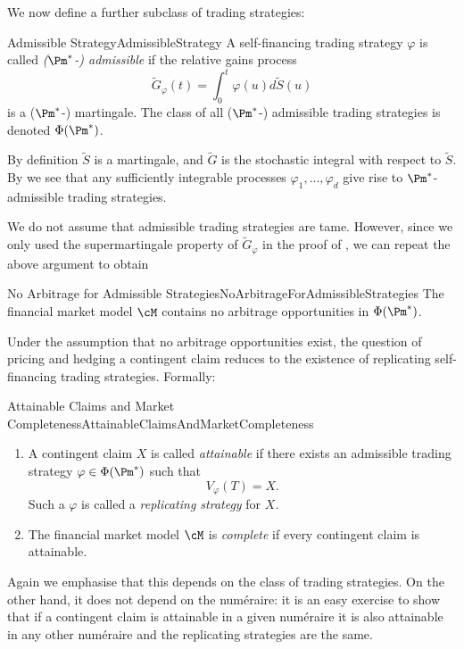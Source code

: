 We now define a further subclass of trading strategies:

\begin{defn}{Admissible Strategy}{AdmissibleStrategy}
	A self-financing trading strategy $\varphi$ is called \textit{($\Pm^*$-) admissible} if the relative gains process
	\[
		\tilde{G}_{\varphi}(t) = \int_0^t \varphi(u)d\tilde{S}(u)
	\]
	is a ($\Pm^*$-) martingale. The class of all ($\Pm^*$-) admissible trading strategies is denoted $\Phi(\Pm^*)$.
\end{defn}

By definition $\tilde{S}$ is a martingale, and $\tilde{G}$ is the stochastic integral with respect to $\tilde{S}$. By  we see that any sufficiently integrable processes $\varphi_1, \dots, \varphi_d$ give rise to $\Pm^*$-admissible trading strategies.

We do not assume that admissible trading strategies are tame. However, since we only used the supermartingale property of \(\tilde{G}_{\varphi}\) in the proof of , we can repeat the above argument to obtain

\begin{thm}{No Arbitrage for Admissible Strategies}{NoArbitrageForAdmissibleStrategies}
	The financial market model $\cM$ contains no arbitrage opportunities in $\Phi(\Pm^*)$.
\end{thm}

Under the assumption that no arbitrage opportunities exist, the question of pricing and hedging a contingent claim reduces to the existence of replicating self-financing trading strategies. Formally:

\begin{defn}{Attainable Claims and Market Completeness}{AttainableClaimsAndMarketCompleteness}
	\begin{enumerate}[label=(\roman*), leftmargin=*]
		\item A contingent claim $X$ is called \textit{attainable} if there exists an admissible trading strategy $\varphi \in \Phi(\Pm^*)$ such that
		      \[
			      V_{\varphi}(T) = X.
		      \]
		      Such a $\varphi$ is called a \textit{replicating strategy} for $X$.
		\item The financial market model $\cM$ is \textit{complete} if every contingent claim is attainable.
	\end{enumerate}
\end{defn}

Again we emphasise that this depends on the class of trading strategies. On the other hand, it does not depend on the num\'{e}raire: it is an easy exercise to show that if a contingent claim is attainable in a given num\'{e}raire it is also attainable in any other num\'{e}raire and the replicating strategies are the same.

